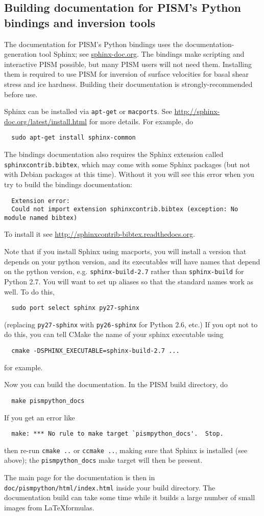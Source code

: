 \documentclass[titlepage,letterpaper,final]{scrartcl}
\begin{document}
\subsection{Building documentation for PISM's Python bindings and inversion tools}
The documentation for PISM's Python bindings uses the documentation-generation tool Sphinx; see \href{http://sphinx-doc.org/}{sphinx-doc.org}.  The bindings make scripting and interactive PISM possible, but many PISM users will not need them.  Installing them is required to use PISM for inversion of surface velocities for basal shear stress and ice hardness.  Building their documentation is strongly-recommended before use.

Sphinx can be installed via \texttt{apt-get} or \texttt{macports}.
See \url{http://sphinx-doc.org/latest/install.html} for more details.  For example, do
\begin{verbatim}
  sudo apt-get install sphinx-common
\end{verbatim}

The bindings documentation also requires the Sphinx extension called \texttt{sphinxcontrib.bibtex}, which may come with some Sphinx packages (but not with Debian packages at this time).  Without it you will see this error when you try to build the bindings documentation:
\begin{verbatim}
  Extension error:
  Could not import extension sphinxcontrib.bibtex (exception: No module named bibtex)
\end{verbatim}
To install it see \url{http://sphinxcontrib-bibtex.readthedocs.org}.

Note that if you install Sphinx using macports,
you will install a version that depends on your python
version, and its executables will have names that
depend on the python version, e.g. \texttt{sphinx-build-2.7}
rather than \texttt{sphinx-build} for Python 2.7.  You will want to
set up aliases so that the standard names work as well. To do this,
\begin{verbatim}
  sudo port select sphinx py27-sphinx
\end{verbatim}
(replacing \texttt{py27-sphinx} with \texttt{py26-sphinx} for Python 2.6, etc.)
If you opt not to do this, you can tell CMake the
name of your sphinx executable using
\begin{verbatim}
  cmake -DSPHINX_EXECUTABLE=sphinx-build-2.7 ...
\end{verbatim}
for example.

Now you can build the documentation.  In the PISM build directory, do
\begin{verbatim}
  make pismpython_docs
\end{verbatim}
If you get an error like
\begin{verbatim}
  make: *** No rule to make target `pismpython_docs'.  Stop.
\end{verbatim}
then re-run \texttt{cmake ..} or  \texttt{ccmake ..}, making sure that Sphinx is installed
(see above); the  \texttt{pismpython_docs} make target will then be present.

The main page for the documentation is then in
 \texttt{doc/pismpython/html/index.html} inside your build directory. The
documentation build can take some time while it
builds a large number of small images from
\LaTeX formulas.
\end{document}
